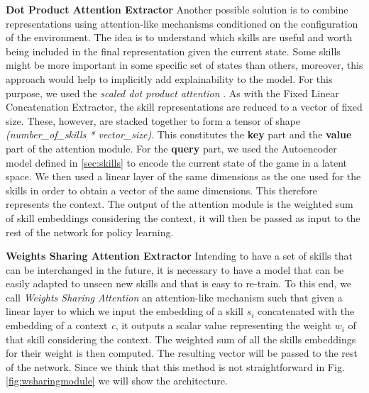 \textbf{Dot Product Attention Extractor}
Another possible solution is to combine representations using attention-like mechanisms conditioned on the configuration of the environment.
The idea is to understand which skills are useful and worth being included in the final representation given the current state. Some skills might be more important in some
specific set of states than others, moreover, this approach would help to implicitly add explainability to the model.
For this purpose, we used the \textit{scaled dot product attention} \cite{vaswani2017attention}.
As with the Fixed Linear Concatenation Extractor, the skill representations are reduced to a vector of fixed size. These, however, are stacked together to form a tensor of shape \textit{(number\_of\_skills * vector\_size)}. This constitutes the \textbf{key} part and the \textbf{value} part of the attention module.
For the \textbf{query} part, we used the Autoencoder model defined in \ref{sec:skills} to encode the current state of the game in a latent space. We then used a linear layer of the same dimensions as the one used for the skills in order to obtain a vector of the same dimensions. This therefore represents the context.
The output of the attention module is the weighted sum of skill embeddings considering the context, it will then be passed as input to the rest of the network for policy learning.

\textbf{Weights Sharing Attention Extractor}
Intending to have a set of skills that can be interchanged in the future, it is necessary to have a model that can be easily adapted to unseen new skills and that is easy to re-train.
To this end, we call \textit{Weights Sharing Attention} an attention-like mechanism such that given a linear layer to which we input the embedding of a skill $s_i$ concatenated with the embedding of a context \textit{c}, it outputs a scalar value representing the weight $w_i$ of that skill considering the context. The weighted sum of all the skills embeddings for their weight is then computed. The resulting vector will be passed to the rest of the network.
Since we think that this method is not straightforward in Fig. \ref{fig:wsharingmodule}  we will show the architecture.

